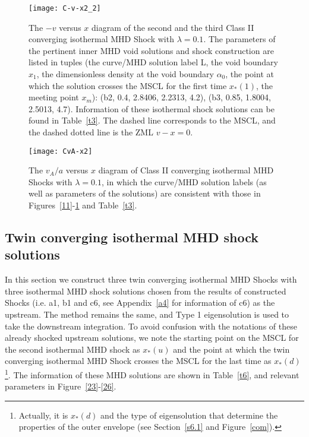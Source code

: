 \documentclass[fleqn,usenatbib]{mnras}
\begin{document}
\begin{figure}
\centering
\texttt{[image: C-v-x2\_2]}
\caption{The $-v$ versus $x$ diagram of the second and the third Class II converging isothermal MHD Shock with $\lambda=0.1$. The parameters of the pertinent inner MHD void solutions and shock construction are listed in tuples (the curve/MHD solution label L, the void boundary $x_{1}$, the dimensionless density at the void boundary $\alpha_{0}$, the point at which the solution crosses the MSCL for the first time $x_{*}(1)$, the meeting point $x_{m}$): (b2, 0.4, 2.8406, 2.2313, 4.2), (b3, 0.85, 1.8004, 2.5013, 4.7). Information of these isothermal shock solutions can be found in Table~\ref{t3}. The dashed line corresponds to the MSCL, and the dashed dotted line is the ZML $v-x=0$.}
\label{12}
\end{figure}



\begin{figure}
\centering
\texttt{[image: CvA-x2]}
\caption{The $v_{A}/a$ versus $x$ diagram of Class II converging isothermal MHD Shocks with $\lambda=0.1$, in which the curve/MHD solution labels (as well as parameters of the solutions) are consistent with those in Figures~\ref{11}-\ref{12} and Table~\ref{t3}.}
\label{15}
\end{figure}




\subsection{Twin converging isothermal MHD shock solutions}
\label{s5.5}
In this section we construct three twin converging isothermal MHD Shocks with three isothermal MHD shock solutions chosen from the results of constructed Shocks (i.e. a1, b1 and c6, see Appendix~\ref{a4} for information of c6) as the upstream. The method remains the same, and Type 1 eigensolution is used to take the downstream integration. To avoid confusion with the notations of these already shocked upstream solutions, we note the starting point on the MSCL for the second isothermal MHD shock as $x_{*}(u)$ and the point at which the twin converging isothermal MHD Shock crosses the MSCL for the last time as $x_{*}(d)$\footnote{Actually, it is $x_{*}(d)$ and the type of eigensolution that determine the properties of the outer envelope (see Section~\ref{s6.1} and Figure~\ref{com}).}. The information of these MHD solutions are shown in Table~\ref{t6}, and relevant parameters in Figure~\ref{23}-\ref{26}.
\end{document}
